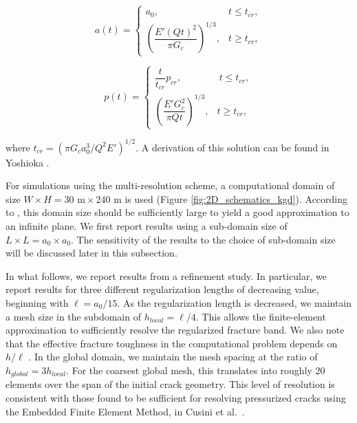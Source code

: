 \begin{equation}\label{length_solution_tkgd}
    a(t) =     \begin{cases}
      a_0, &  t \le t_{cr},  \\
      \left(\dfrac{E'(Qt)^2}{\pi G_c}\right)^{1/3}, &  t \ge t_{cr}, 
    \end{cases}
\end{equation}

\begin{equation}\label{pressure_solution_tkgd}
    p(t) =     \begin{cases}
      \dfrac{t}{t_{cr}}p_{cr}, &  \ t \le t_{cr},\\
      \left(\dfrac{E'G_c^2}{\pi Qt}\right)^{1/3}, &  t \ge t_{cr},
    \end{cases}
\end{equation}

\noindent where $t_{cr} =(\pi G_c a_0^3/Q^2E')^{1/2}$. A derivation of this solution can be found in Yoshioka \cite{yoshioka2020crack}.

For simulations using the multi-resolution scheme, a computational domain of size $W\times H = 30\text{ m} \times 240\text{ m}$ is used (Figure \ref{fig:2D_schematics_kgd}). According to \cite{isida1973analysis}, this domain size should be sufficiently large to yield a good approximation to an infinite plane.  We first report results using a sub-domain size of $L \times L = a_0 \times a_0$.   The sensitivity of the results to the choice of sub-domain size will be discussed later in this subsection.  

In what follows, we report results from a refinement study.  In particular, we report results for three different regularization lengths of decreasing value, beginning with $\ell = a_0/15$.  As the regularization length is decreased, we maintain a mesh size in the subdomain of $h_{local} = \ell/{4}$.  This allows the finite-element approximation to sufficiently resolve the regularized fracture band. We also note that the effective fracture toughness in the computational problem depends on $h/\ell$ \cite{yoshioka2020crack}.  In the global domain, we maintain the mesh spacing at the ratio of $h_{global} = 3h_{local}$.  For the coarsest global mesh, this translates into roughly 20 elements over the span of the initial crack geometry.  This level of resolution is consistent with those found to be sufficient for resolving pressurized cracks using the Embedded Finite Element Method, in Cusini et al.\ \cite{cusini2021simulation}.

